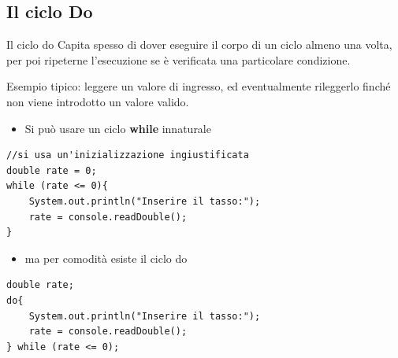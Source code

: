 \subsection*{Il ciclo Do}
\begin{frame}
\begin{block}{Il ciclo do}
Capita spesso di dover eseguire il corpo di un ciclo almeno una volta, per poi ripeterne l'esecuzione se è verificata una particolare
condizione.
\end{block}
\begin{block}{}
Esempio tipico: leggere un valore di ingresso, ed eventualmente rileggerlo finché non viene introdotto un valore valido.
\end{block}
\end{frame}

\begin{frame}[fragile]
\begin{itemize}
\item Si può usare un ciclo \textbf{while} innaturale
\end{itemize}
\begin{lstlisting}
//si usa un'inizializzazione ingiustificata
double rate = 0;
while (rate <= 0){ 
    System.out.println("Inserire il tasso:");
    rate = console.readDouble();
}
\end{lstlisting}
\begin{itemize}
\item ma per comodità esiste il ciclo do
\end{itemize}
\begin{lstlisting}
double rate;
do{ 
    System.out.println("Inserire il tasso:");
    rate = console.readDouble();
} while (rate <= 0);
\end{lstlisting}
\end{frame}

\begin{frame}
\begin{block}{}
\begin{center}
\begin{huge}
\end{huge}
\end{center}
\end{block}
\end{frame}

